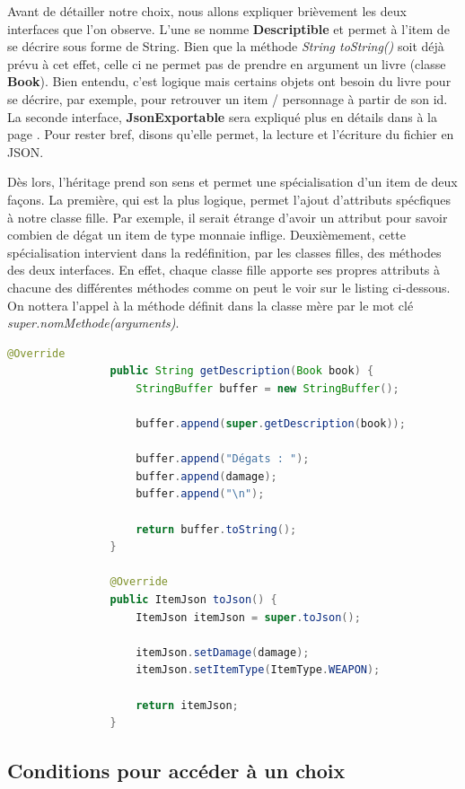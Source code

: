 			Avant de détailler notre choix, nous allons expliquer brièvement les deux interfaces que l'on observe. L'une se nomme \textbf{Descriptible} et permet à l'item de se décrire sous forme de String. Bien que la méthode \textit{String toString()} soit déjà prévu à cet effet, celle ci ne permet pas de prendre en argument un livre (classe \textbf{Book}). Bien entendu, c'est logique mais certains objets ont besoin du livre pour se décrire, par exemple, pour retrouver un item / personnage à partir de son id. La seconde interface, \textbf{JsonExportable} sera expliqué plus en détails dans  à la page \pageref{subsec:lecture_ecriture_fichier}. Pour rester bref, disons qu'elle permet, la lecture et l'écriture du fichier en JSON.

			Dès lors, l'héritage prend son sens et permet une spécialisation d'un item de deux façons. La première, qui est la plus logique, permet l'ajout d'attributs spécfiques à notre classe fille. Par exemple, il serait étrange d'avoir un attribut pour savoir combien de dégat un item de type monnaie inflige. Deuxièmement, cette spécialisation intervient dans la redéfinition, par les classes filles, des méthodes des deux interfaces. En effet, chaque classe fille apporte ses propres attributs à chacune des différentes méthodes comme on peut le voir sur le listing ci-dessous. On nottera l'appel à la méthode définit dans la classe mère par le mot clé \textit{super.nomMethode(arguments)}.

			\begin{lstlisting}[gobble=16, language=Java, caption=Exemple de spécialisation des items]
				@Override
				public String getDescription(Book book) {
					StringBuffer buffer = new StringBuffer();

					buffer.append(super.getDescription(book));

					buffer.append("Dégats : ");
					buffer.append(damage);
					buffer.append("\n");

					return buffer.toString();
				}

				@Override
				public ItemJson toJson() {
					ItemJson itemJson = super.toJson();

					itemJson.setDamage(damage);
					itemJson.setItemType(ItemType.WEAPON);

					return itemJson;
				}
			\end{lstlisting}

		\subsection{Conditions pour accéder à un choix}

